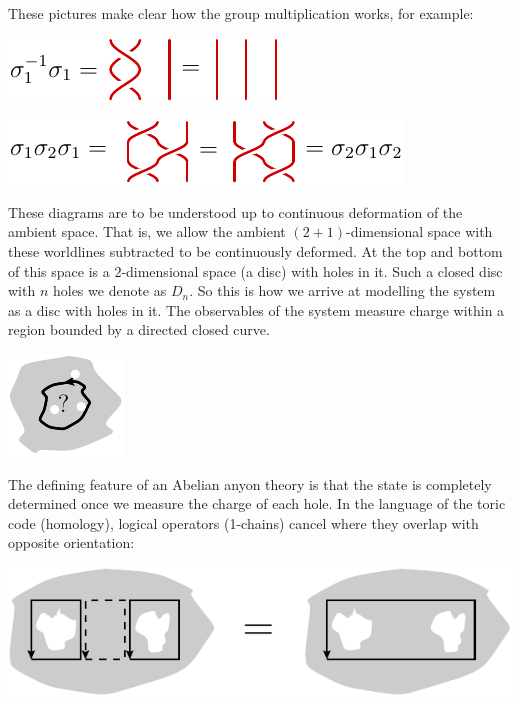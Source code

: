 \documentclass[aps, prl, letterpaper, twocolumn, superscriptaddress, notitlepage, 10pt]{revtex4-1}
\begin{document}
These pictures make clear how the group
multiplication works, for example:
\begin{center}
\includegraphics[]{pic-braid-group-1.pdf}
\end{center}
\begin{center}
\includegraphics[]{pic-braid-relation.pdf}
\end{center}


These diagrams are to be understood up to
continuous deformation of the ambient space.
That is, we allow the ambient $(2+1)$-dimensional
space with these worldlines subtracted to be continuously
deformed.
At the top and bottom of this space is 
a $2$-dimensional space (a disc) with holes in it.
Such a closed disc with $n$ holes we denote as $D_n.$
So this is how we arrive at modelling the system as
a disc with holes in it.
The observables of the system measure charge within
a region bounded by a directed closed curve.
\begin{center}
\includegraphics[]{pic-observable.pdf}
\end{center}

The defining feature of an Abelian anyon theory
is that the state is completely determined once
we measure the charge of each hole.
In the language of the toric code (homology),
logical operators (1-chains)
cancel where they overlap
with opposite orientation:
\begin{center}
\includegraphics[width=0.4\columnwidth]{pic-abelian.pdf}
\end{center}
\end{document}
